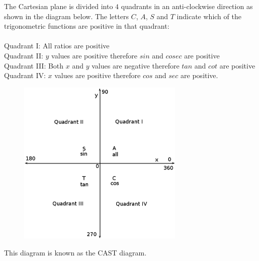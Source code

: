 The Cartesian plane is divided into $4$ quadrants in an anti-clockwise direction as shown in the diagram below. The letters $C$, $A$, $S$ and $T$ indicate which of the trigonometric functions are positive in that quadrant: \\
\\
Quadrant I: All ratios are positive\\
Quadrant II: $y$ values are positive therefore $sin$ and $cosec$ are positive\\
Quadrant III: Both $x$ and $y$ values are negative therefore $tan$ and $cot$ are positive \\
Quadrant IV: $x$ values are positive therefore $cos$ and $sec$ are positive.\par



\begin{figure}[H] %
\begin{center}
\label{m39411*id63358!!!underscore!!!media}\label{m39411*id63358!!!underscore!!!printimage}\includegraphics[width=300px]{col11306.imgs/m39411_CAST.png} %
\vspace{2pt}
\vspace{.1in}
\end{center}
\end{figure} 
 This diagram is known as the CAST diagram.


